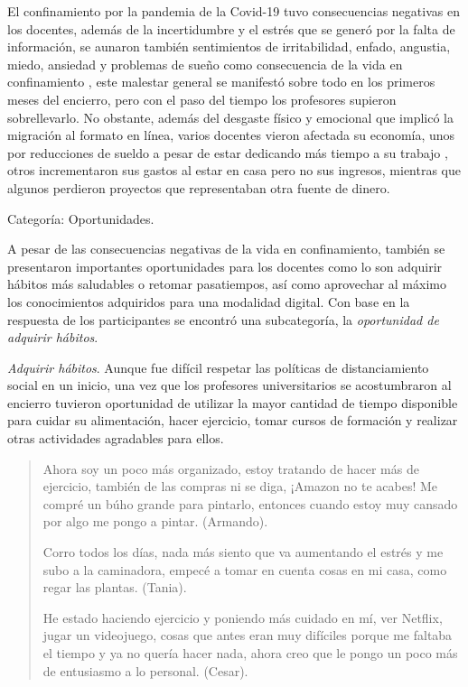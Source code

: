 \documentclass[spanish]{textolivre}
\begin{document}
El confinamiento por la pandemia de la Covid-19 tuvo consecuencias negativas en los docentes, además de la incertidumbre y el estrés que se generó por la falta de información, se aunaron también sentimientos de irritabilidad, enfado, angustia, miedo, ansiedad y problemas de sueño como consecuencia de la vida en confinamiento \cite{quispe_victoria_impacto_2020}, este malestar general se manifestó sobre todo en los primeros meses del encierro, pero con el paso del tiempo los profesores supieron sobrellevarlo. No obstante, además del desgaste físico y emocional que implicó la migración al formato en línea, varios docentes vieron afectada su economía, unos por reducciones de sueldo a pesar de estar dedicando más tiempo a su trabajo \cite{penuelas_ensenanza_2020}, otros incrementaron sus gastos al estar en casa pero no sus ingresos, mientras que algunos perdieron proyectos que representaban otra fuente de dinero.

Categoría: Oportunidades.

A pesar de las consecuencias negativas de la vida en confinamiento, también se presentaron importantes oportunidades para los docentes como lo son adquirir hábitos más saludables o retomar pasatiempos, así como aprovechar al máximo los conocimientos adquiridos para una modalidad digital. Con base en la respuesta de los participantes se encontró una subcategoría, la \textit{oportunidad de adquirir hábitos}.

\textit{Adquirir hábitos}. Aunque fue difícil respetar las políticas de distanciamiento social en un inicio, una vez que los profesores universitarios se acostumbraron al encierro tuvieron oportunidad de utilizar la mayor cantidad de tiempo disponible para cuidar su alimentación, hacer ejercicio, tomar cursos de formación y realizar otras actividades agradables para ellos.

\begin{quote}
    Ahora soy un poco más organizado, estoy tratando de hacer más de ejercicio, también de las compras ni se diga, ¡Amazon no te acabes! Me compré un búho grande para pintarlo, entonces cuando estoy muy cansado por algo me pongo a pintar. (Armando).
    
    Corro todos los días, nada más siento que va aumentando el estrés y me subo a la caminadora, empecé a tomar en cuenta cosas en mi casa, como regar las plantas. (Tania).
    
    He estado haciendo ejercicio y poniendo más cuidado en mí, ver Netflix, jugar un videojuego, cosas que antes eran muy difíciles porque me faltaba el tiempo y ya no quería hacer nada, ahora creo que le pongo un poco más de entusiasmo a lo personal. (Cesar).
\end{quote}
\end{document}

